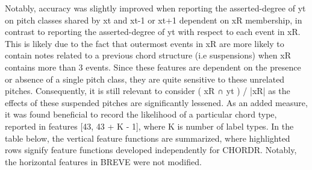 \documentclass{article} %
\begin{document}
Notably, accuracy was slightly improved when reporting the asserted-degree of yt on pitch classes shared by xt and xt-1 or xt+1 dependent on xR membership, in contrast to reporting the asserted-degree of yt with respect to each event in xR. This is likely due to the fact that outermost events in xR are more likely to contain notes related to a previous chord structure (i.e suspensions) when xR contains more than 3 events. Since these features are dependent on the presence or absence of a single pitch class, they are quite sensitive to these unrelated pitches. Consequently, it is still relevant to consider ( xR ∩ yt ) / |xR| as the effects of these suspended pitches are significantly lessened. As an added measure, it was found beneficial to record the likelihood of a particular chord type, reported in features [43, 43 + K - 1], where K is number of label types. In the table below, the vertical feature functions are summarized, where highlighted rows signify feature functions developed independently for CHORDR. Notably, the horizontal features in BREVE were not modified.
\end{document}
